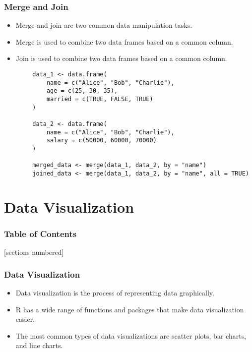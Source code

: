 \documentclass[serif, 9pt, aspectratio=32]{beamer}
\begin{document}
\begin{frame}
    \centering
    \frametitle{Merge and Join}
    \begin{itemize}
        \setlength{\itemsep}{2em}
        \item Merge and join are two common data manipulation tasks.
        \item Merge is used to combine two data frames based on a common column.
        \item Join is used to combine two data frames based on a common column.
    \end{itemize}
\end{frame}

\begin{frame}[fragile]
    \begin{lstlisting}
        data_1 <- data.frame(
            name = c("Alice", "Bob", "Charlie"),
            age = c(25, 30, 35),
            married = c(TRUE, FALSE, TRUE)
        )

        data_2 <- data.frame(
            name = c("Alice", "Bob", "Charlie"),
            salary = c(50000, 60000, 70000)
        )

        merged_data <- merge(data_1, data_2, by = "name")
        joined_data <- merge(data_1, data_2, by = "name", all = TRUE)
    \end{lstlisting}
\end{frame}

\section{Data Visualization}

\begin{frame}
    \frametitle{Table of Contents}
    [sections numbered]
    \tableofcontents[currentsection]
\end{frame}

\begin{frame}
    \centering
    \frametitle{Data Visualization}
    \begin{itemize}
        \setlength{\itemsep}{2em}
        \item Data visualization is the process of representing data graphically.
        \item R has a wide range of functions and packages that make data visualization easier.
        \item The most common types of data visualizations are scatter plots, bar charts, and line charts.
    \end{itemize}
\end{frame}
\end{document}
